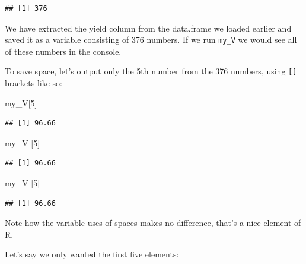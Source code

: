 \documentclass[
]{book}
\newenvironment{Shaded}{\begin{snugshade}}{\end{snugshade}}
\newcommand{\DecValTok}[1]{\textcolor[rgb]{0.00,0.00,0.81}{#1}}
\newcommand{\FunctionTok}[1]{\textcolor[rgb]{0.00,0.00,0.00}{#1}}
\newcommand{\NormalTok}[1]{#1}
\newcommand{\OtherTok}[1]{\textcolor[rgb]{0.56,0.35,0.01}{#1}}
\newcommand{\SpecialCharTok}[1]{\textcolor[rgb]{0.00,0.00,0.00}{#1}}
\begin{document}
\begin{Shaded}
\end{Shaded}

\begin{verbatim}
## [1] 376
\end{verbatim}

We have extracted the yield column from the data.frame we loaded earlier and saved it as a variable consisting of 376 numbers. If we run \texttt{my\_V} we would see all of these numbers in the console.

To save space, let's output only the 5th number from the 376 numbers, using \texttt{{[}{]}} brackets like so:

\begin{Shaded}
\begin{Highlighting}[]
\NormalTok{my\_V[}\DecValTok{5}\NormalTok{]}
\end{Highlighting}
\end{Shaded}

\begin{verbatim}
## [1] 96.66
\end{verbatim}

\begin{Shaded}
\begin{Highlighting}[]
\NormalTok{my\_V      [}\DecValTok{5}\NormalTok{]}
\end{Highlighting}
\end{Shaded}

\begin{verbatim}
## [1] 96.66
\end{verbatim}

\begin{Shaded}
\begin{Highlighting}[]
\NormalTok{my\_V            [}\DecValTok{5}\NormalTok{]}
\end{Highlighting}
\end{Shaded}

\begin{verbatim}
## [1] 96.66
\end{verbatim}

Note how the variable uses of spaces makes no difference, that's a nice element of R.

Let's say we only wanted the first five elements:
\end{document}
